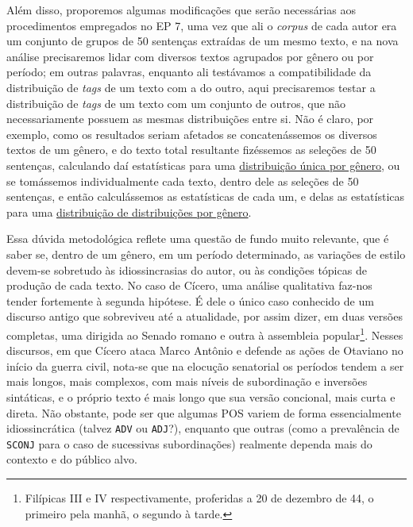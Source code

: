 \documentclass[10pt,a4paper,onecolumn]{article}
\theoremstyle{definition}
\theoremstyle{remark}
\begin{document}
Além disso, proporemos algumas modificações que serão necessárias aos procedimentos empregados no EP 7, uma vez que ali o \emph{corpus} de cada autor era um conjunto de grupos de 50 sentenças extraídas de um mesmo texto, e na nova análise precisaremos lidar com diversos textos agrupados por gênero ou por período; em outras palavras, enquanto ali testávamos a compatibilidade da distribuição de \emph{tags} de um texto com a do outro, aqui precisaremos testar a distribuição de \emph{tags} de um texto com um conjunto de outros, que não necessariamente possuem as mesmas distribuições entre si. Não é claro, por exemplo, como os resultados seriam afetados se concatenássemos os diversos textos de um gênero, e do texto total resultante fizéssemos as seleções de 50 sentenças, calculando daí estatísticas para uma \underline{distribuição única por gênero}, ou se tomássemos individualmente cada texto, dentro dele as seleções de 50 sentenças, e então calculássemos as estatísticas de cada um, e delas as estatísticas para uma \underline{distribuição de distribuições por gênero}. 

Essa dúvida metodológica reflete uma questão de fundo muito relevante, que é saber se, dentro de um gênero, em um período determinado, as variações de estilo devem-se sobretudo às idiossincrasias do autor, ou às condições tópicas de produção de cada texto. No caso de Cícero, uma análise qualitativa faz-nos tender fortemente à segunda hipótese. É dele o único caso conhecido de um discurso antigo que sobreviveu até a atualidade, por assim dizer, em duas versões completas, uma dirigida ao Senado romano e outra à assembleia popular\footnote{Filípicas III e IV respectivamente, proferidas a 20 de dezembro de 44, o primeiro pela manhã, o segundo à tarde.}. Nesses discursos, em que Cícero ataca Marco Antônio e defende as ações de Otaviano no início da guerra civil, nota-se que na elocução senatorial os períodos tendem a ser mais longos, mais complexos, com mais níveis de subordinação e inversões sintáticas, e o próprio texto é mais longo que sua versão concional, mais curta e direta. Não obstante, pode ser que algumas POS variem de forma essencialmente idiossincrática (talvez \texttt{ADV} ou \texttt{ADJ}?), enquanto que outras (como a prevalência de \texttt{SCONJ} para o caso de sucessivas subordinações) realmente dependa mais do contexto e do público alvo.
\end{document}

